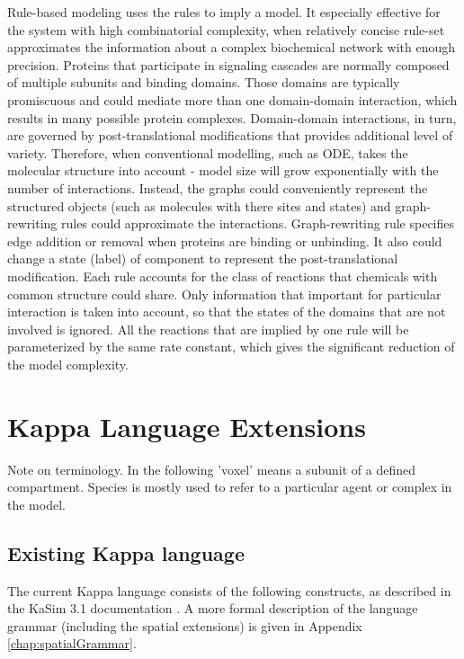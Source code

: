Rule-based modeling uses the rules to imply a model. It especially effective for the system with high combinatorial complexity, when relatively concise rule-set approximates the information about a complex biochemical network with enough precision. Proteins that participate in signaling cascades are normally composed of multiple subunits and binding domains. Those domains are typically promiscuous and could mediate  more than one domain-domain interaction, which results in many possible protein complexes. Domain-domain interactions, in turn, are governed by post-translational modifications that provides additional level of variety. Therefore, when conventional modelling, such as ODE, takes the molecular structure into account - model size will grow exponentially with the number of interactions.
Instead, the graphs could conveniently  represent the structured objects (such as molecules with there sites and states) and graph- rewriting rules could approximate the interactions. 
Graph-rewriting rule specifies edge addition or removal  when proteins are binding or unbinding. It also could change a state (label) of component to represent the post-translational modification.  Each rule accounts for the class of reactions that chemicals with common structure could share.  Only information that important for particular interaction is taken into account, so that the states of the domains that are not involved is ignored. All the reactions that are implied by one rule will be parameterized by the same rate constant, which gives the significant reduction of the model complexity.

\chapter{Kappa Language Extensions}

Note on terminology. In the following 'voxel' means a subunit of a defined compartment. Species is mostly used to refer to a particular agent or complex in the model.

\section{Existing Kappa language}

The current Kappa language consists of the following constructs, as described in the KaSim 3.1 documentation \citep{KaSimManual2012}. A more formal description of the language grammar (including the spatial extensions) is given in Appendix \ref{chap:spatialGrammar}.



